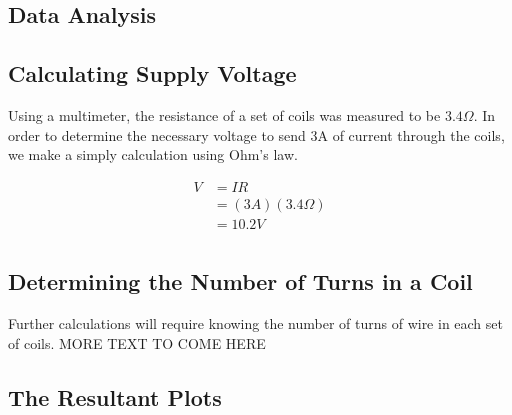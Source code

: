 \documentclass[a4paper]{article}
\begin{document}
\begin{itemize}
\section{Data Analysis}


\subsection{Calculating Supply Voltage}

Using a multimeter, the resistance of a set of coils was measured to
be $3.4 \Omega$. In order to determine the necessary voltage to send
3A of current through the coils, we make a simply calculation using
Ohm's law.

\begin{align*}
V &= IR \\
  &= (3A)(3.4 \Omega) \\
  &= 10.2V \\
\end{align*}

\subsection{Determining the Number of Turns in a Coil}

Further calculations will require knowing the number of turns of wire
in each set of coils. MORE TEXT TO COME HERE
\subsection{The Resultant Plots}


\end{itemize}
\end{document}
